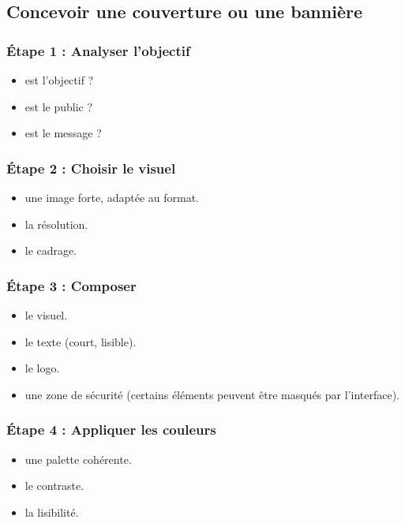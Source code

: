 \subsection{Concevoir une couverture ou une bannière}

\subsubsection{Étape 1 : Analyser l'objectif}

\begin{itemize}
    \item {} est l'objectif ?
    \item {} est le public ?
    \item {} est le message ?
\end{itemize}

\subsubsection{Étape 2 : Choisir le visuel}

\begin{itemize}
    \item {} une image forte, adaptée au format.
    \item {} la résolution.
    \item {} le cadrage.
\end{itemize}

\subsubsection{Étape 3 : Composer}

\begin{itemize}
    \item {} le visuel.
    \item {} le texte (court, lisible).
    \item {} le logo.
    \item {} une zone de sécurité (certains éléments peuvent être masqués par l'interface).
\end{itemize}

\subsubsection{Étape 4 : Appliquer les couleurs}

\begin{itemize}
    \item {} une palette cohérente.
    \item {} le contraste.
    \item {} la lisibilité.
\end{itemize}


